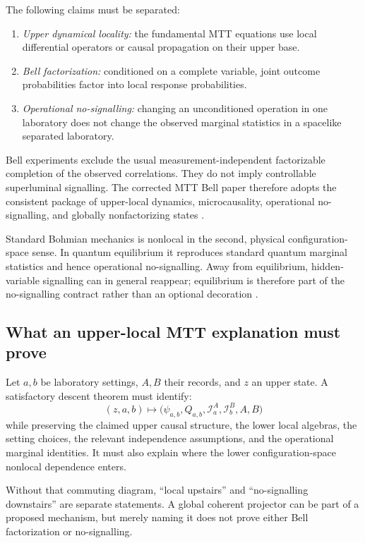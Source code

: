 \documentclass[11pt]{article}
\theoremstyle{definition}
\theoremstyle{remark}
\newcommand{\cI}{\mathcal I}
\let\MTToriginalitem\item
\renewcommand{\item}{\par\MTToriginalitem}
\begin{document}
The following claims must be separated:
\begin{enumerate}[leftmargin=2em]
\item \emph{Upper dynamical locality:} the fundamental MTT equations use
      local differential operators or causal propagation on their upper
      base.
\item \emph{Bell factorization:} conditioned on a complete variable, joint
      outcome probabilities factor into local response probabilities.
\item \emph{Operational no-signalling:} changing an unconditioned operation
      in one laboratory does not change the observed marginal statistics in
      a spacelike separated laboratory.
\end{enumerate}
Bell experiments exclude the usual measurement-independent factorizable
completion of the observed correlations.  They do not imply controllable
superluminal signalling.  The corrected MTT Bell paper therefore adopts the
consistent package of upper-local dynamics, microcausality, operational
no-signalling, and globally nonfactorizing states
\cite{Bell1964,MTTBell2026}.

Standard Bohmian mechanics is nonlocal in the second, physical
configuration-space sense.  In quantum equilibrium it reproduces standard
quantum marginal statistics and hence operational no-signalling.  Away
from equilibrium, hidden-variable signalling can in general reappear;
equilibrium is therefore part of the no-signalling contract rather than an
optional decoration \cite{Valentini1991}.

\subsection{What an upper-local MTT explanation must prove}

Let \(a,b\) be laboratory settings, \(A,B\) their records, and \(z\) an
upper state.  A satisfactory descent theorem must identify:
\[
(z,a,b)
\longmapsto
\bigl(\psi_{a,b},Q_{a,b},\cI^A_a,\cI^B_b,A,B\bigr)
\]
while preserving the claimed upper causal structure, the lower local
algebras, the setting choices, the relevant independence assumptions, and
the operational marginal identities.  It must also explain where the
lower configuration-space nonlocal dependence enters.

Without that commuting diagram, ``local upstairs'' and ``no-signalling
downstairs'' are separate statements.  A global coherent projector can be
part of a proposed mechanism, but merely naming it does not prove either
Bell factorization or no-signalling.
\end{document}
